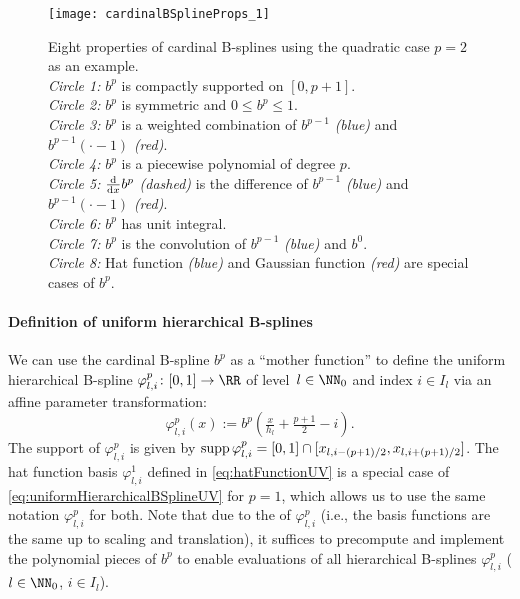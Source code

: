 \begin{figure}
  \texttt{[image: cardinalBSplineProps\_1]}%
  \caption{%
    Eight properties of cardinal B-splines using the quadratic case
    $p = 2$ as an example.\\
    \emph{Circle 1:} $b^p$ is compactly supported on $[0, p+1]$.\\
    \emph{Circle 2:} $b^p$ is symmetric and $0 \le b^p \le 1$.\\
    \emph{Circle 3:} $b^p$ is a weighted combination of
    $b^{p-1}$ \emph{\textcolor{C0}{(blue)}} and
    $b^{p-1}({\cdot} - 1)$ \emph{\textcolor{C1}{(red)}}.\\
    \emph{Circle 4:} $b^p$ is a piecewise polynomial of degree $p$.\\
    \emph{Circle 5:} $\frac{\mathop{}\!\mathrm{d}}{\mathop{}\!\mathrm{d}{}x} b^p$ \emph{(dashed)}
    is the difference of
    $b^{p-1}$ \emph{\textcolor{C0}{(blue)}} and
    $b^{p-1}({\cdot} - 1)$ \emph{\textcolor{C1}{(red)}}.\\
    \emph{Circle 6:} $b^p$ has unit integral.\\
    \emph{Circle 7:} $b^p$ is the convolution of
    $b^{p-1}$ \emph{\textcolor{C0}{(blue)}} and $b^0$.\\
    \emph{Circle 8:} Hat function \emph{\textcolor{C0}{(blue)}} and
    Gaussian function \emph{\textcolor{C1}{(red)}}
    are special cases of $b^p$.%
  }%
  \label{fig:cardinalBSplineProps}
\end{figure}

\paragraph{Definition of uniform hierarchical B-splines}

%
We can use the cardinal B-spline $b^p$ as a ``mother function'' to
define the uniform hierarchical B-spline
$\varphi_{l,i}^p\colon [0, 1] \to \RR$ of level~$l \in \NN_0$ and index
$i \in I_l$ via an affine parameter transformation:
\begin{equation}
  \label{eq:uniformHierarchicalBSplineUV}
  \varphi_{l,i}^p(x)
  := b^p(\tfrac{x}{h_l} + \tfrac{p+1}{2} - i).
\end{equation}
The support of $\varphi_{l,i}^p$ is given
by $\operatorname{supp} \varphi_{l,i}^p = [0, 1] \cap [x_{l,i-(p+1)/2}, x_{l,i+(p+1)/2}]$.
The hat function basis $\varphi_{l,i}^1$ defined in
\eqref{eq:hatFunctionUV} is a special case of
\eqref{eq:uniformHierarchicalBSplineUV} for $p = 1$,
which allows us to use the same notation $\varphi_{l,i}^p$ for both.
Note that due to the  of $\varphi_{l,i}^p$
(i.e., the basis functions are the same up to scaling and translation),
it suffices to precompute and implement the polynomial pieces of $b^p$
to enable evaluations of all hierarchical B-splines
$\varphi_{l,i}^p$ ($l \in \NN_0$, $i \in I_l$).

